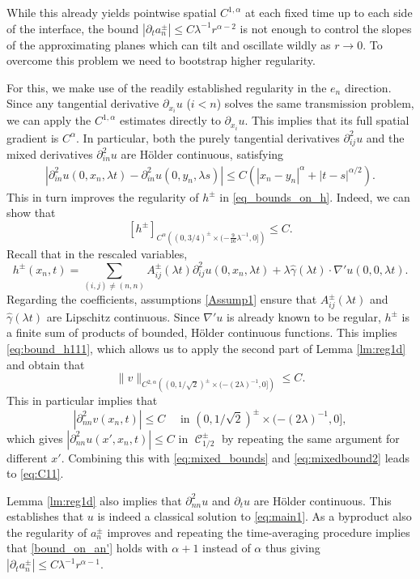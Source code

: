 \documentclass[12pt]{article}
\makeatletter
\newenvironment{customproof}[1]{%
  \par\pushQED{\qed}%
  \normalfont\topsep6pt \trivlist
  \item[\hskip\labelsep\itshape
    Proof of #1\@addpunct{.}]\ignorespaces
}{%
  \popQED\endtrivlist\@endpefalse
}
\numberwithin{Theorem}{section}
\theoremstyle{definition}
\theoremstyle{remark}
\numberwithin{equation}{section}
\DeclareMathOperator{\C}{\mathcal{C}}
\newcommand{\p}{\partial}
\makeatother
\begin{document}
\begin{customproof}{Theorem \ref{Thm:C1gamma}}
While this already yields pointwise spatial $C^{1,\alpha}$  at each fixed time up to each side of the interface, the bound $|\partial_t a_n^\pm| \le C \lambda^{-1} r^{\alpha-2}$ is not enough to  control the slopes of the approximating planes which can tilt and oscillate wildly as $r \to 0$. To overcome this problem we need to bootstrap higher regularity.
    




For this, we make use of the readily established regularity in the $e_n$ direction. Since any tangential derivative $\partial_{x_i} u$  ($i<n$) solves the same transmission problem, we can apply the $C^{1,\alpha}$ estimates directly to $\partial_{x_i} u$. This implies that its full spatial gradient is $C^\alpha$. In particular, both the purely tangential derivatives $\partial_{ij}^2 u$ and the mixed derivatives $\partial_{in}^2 u$ are H\"older continuous, satisfying
\begin{align} \label{eq:mixedbound2}
 |\partial_{in}^2 u (0,x_n,\lambda t) - \partial_{in}^2 u (0,y_n,\lambda s)| \leq  C\left(|x_n-y_n|^\alpha + |t-s|^{\alpha/2}\right).
\end{align}
This in turn improves the regularity of $h^\pm$ in \eqref{eq_bounds_on_h}.
Indeed, we can show that 
\begin{equation}\label{eq:bound_h111}
    [h^\pm]_{C^\alpha\left((0,3/4)^\pm \times (-\frac{9}{16}\lambda^{-1},0] \right)} \leq C.
\end{equation}
Recall that in the rescaled variables, 
$$
h^\pm(x_n, t) = \sum_{(i,j) \neq (n,n)} A_{ij}^\pm(\lambda t) \partial_{ij}^2 u(0,x_n,\lambda t) + \lambda \hat{\gamma}(\lambda t) \cdot \nabla' u(0,0,\lambda t).
$$
Regarding the coefficients, assumptions \eqref{Assump1} ensure that  $A_{ij}^\pm(\lambda t)$ and $\hat{\gamma}(\lambda t)$ are Lipschitz continuous. 
Since $\nabla' u$ is already known to be regular, $h^\pm$ is a finite sum of products of bounded, H\"older continuous functions. This implies \eqref{eq:bound_h111}, which allows us to apply the second part of Lemma \ref{lm:reg1d} and obtain that 
$$
\|v\|_{C^{2,\alpha}\left( (0,1/\sqrt{2})^\pm \times (-(2\lambda)^{-1},0] \right)} \leq C.
$$
This in particular implies that 
$$|\p_{nn}^2 v(x_n, t)| \leq C \quad \text{ in } (0,1/\sqrt{2})^\pm \times (-(2\lambda)^{-1},0],$$
which gives $|\p_{nn}^2 u(x',x_n,t)| \leq C$ in $\C_{1/2}^\pm$ by repeating the same argument for different $x'$. Combining this with \eqref{eq:mixed_bounds} and  \eqref{eq:mixedbound2} leads to \eqref{eq:C11}.

Lemma \ref{lm:reg1d} also implies that $\p_{nn}^2 u$ and $\p_t u$ are H\"older continuous. This establishes that $u$ is indeed a classical solution to \eqref{eq:main1}. As a byproduct also the regularity of $a_n^\pm$ improves and repeating the time-averaging procedure implies that \eqref{bound_on_an'} holds with $\alpha+1$ instead of $\alpha$ thus giving $ |\p_t a_n^\pm| \leq C \lambda^{-1} r^{\alpha-1}$.

 \end{customproof} 
\end{document}
